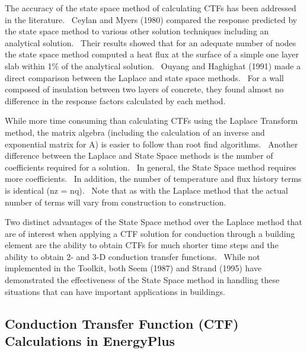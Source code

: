 The accuracy of the state space method of calculating CTFs has been addressed in the literature.~ Ceylan and Myers (1980) compared the response predicted by the state space method to various other solution techniques including an analytical solution.~ Their results showed that for an adequate number of nodes the state space method computed a heat flux at the surface of a simple one layer slab within 1\% of the analytical solution.~ Ouyang and Haghighat (1991) made a direct comparison between the Laplace and state space methods.~ For a wall composed of insulation between two layers of concrete, they found almost no difference in the response factors calculated by each method.

While more time consuming than calculating CTFs using the Laplace Transform method, the matrix algebra (including the calculation of an inverse and exponential matrix for A) is easier to follow than root find algorithms.~ Another difference between the Laplace and State Space methods is the number of coefficients required for a solution.~ In general, the State Space method requires more coefficients.~ In addition, the number of temperature and flux history terms is identical (nz = nq).~ Note that as with the Laplace method that the actual number of terms will vary from construction to construction.

Two distinct advantages of the State Space method over the Laplace method that are of interest when applying a CTF solution for conduction through a building element are the ability to obtain CTFs for much shorter time steps and the ability to obtain 2- and 3-D conduction transfer functions.~ While not implemented in the Toolkit, both Seem (1987) and Strand (1995) have demonstrated the effectiveness of the State Space method in handling these situations that can have important applications in buildings.

\subsection{Conduction Transfer Function (CTF) Calculations in EnergyPlus}\label{conduction-transfer-function-ctf-calculations-in-energyplus}

